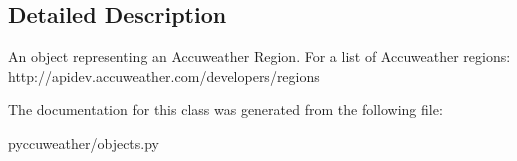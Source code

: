 \subsection{Detailed Description}
\begin{DoxyVerb}An object representing an Accuweather Region.
For a list of Accuweather regions: http://apidev.accuweather.com/developers/regions
\end{DoxyVerb}
 

The documentation for this class was generated from the following file\+:\begin{DoxyCompactItemize}
\item 
pyccuweather/objects.\+py\end{DoxyCompactItemize}
